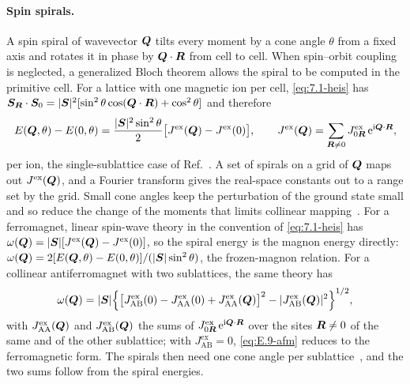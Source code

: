 \paragraph{Spin spirals.} A spin spiral of wavevector $\bm{Q}$ tilts every moment by a cone angle $\theta$ from a fixed axis and rotates it in phase by $\bm{Q}\cdot\bm{R}$ from cell to cell. When spin--orbit coupling is neglected, a generalized Bloch theorem allows the spiral to be computed in the primitive cell. For a lattice with one magnetic ion per cell, \cref{eq:7.1-heis} has $\bm{S}_{\bm{R}}\cdot\bm{S}_0 = |\bm{S}|^2[\sin^2\theta\cos(\bm{Q}\cdot\bm{R}) + \cos^2\theta]$ and therefore
\begin{equation}
  E(\bm{Q},\theta) - E(0,\theta) = \frac{|\bm{S}|^2\sin^2\theta}{2}\bigl[J^{\mathrm{ex}}(\bm{Q}) - J^{\mathrm{ex}}(0)\bigr], \qquad J^{\mathrm{ex}}(\bm{Q}) = \sum_{\bm{R}\neq0}J^{\mathrm{ex}}_{0\bm{R}}\,\mathrm{e}^{\mathrm{i}\bm{Q}\cdot\bm{R}} ,
  \label{eq:E.9-spiral}
\end{equation}
per ion, the single-sublattice case of Ref.~\cite[Eq.~(7)]{jacobsson2013exchange}. A set of spirals on a grid of $\bm{Q}$ maps out $J^{\mathrm{ex}}(\bm{Q})$, and a Fourier transform gives the real-space constants out to a range set by the grid. Small cone angles keep the perturbation of the ground state small and so reduce the change of the moments that limits collinear mapping~\cite[Sect.~II]{jacobsson2013exchange}. For a ferromagnet, linear spin-wave theory in the convention of \cref{eq:7.1-heis} has $\omega(\bm{Q}) = |\bm{S}|[J^{\mathrm{ex}}(\bm{Q}) - J^{\mathrm{ex}}(0)]$, so the spiral energy is the magnon energy directly: $\omega(\bm{Q}) = 2[E(\bm{Q},\theta) - E(0,\theta)]/(|\bm{S}|\sin^2\theta)$, the frozen-magnon relation. For a collinear antiferromagnet with two sublattices, the same theory has
\begin{equation}
  \omega(\bm{Q}) = |\bm{S}|\Bigl\{\bigl[J^{\mathrm{ex}}_{\mathrm{AB}}(0) - J^{\mathrm{ex}}_{\mathrm{AA}}(0) + J^{\mathrm{ex}}_{\mathrm{AA}}(\bm{Q})\bigr]^2 - |J^{\mathrm{ex}}_{\mathrm{AB}}(\bm{Q})|^2\Bigr\}^{1/2} ,
  \label{eq:E.9-afm}
\end{equation}
with $J^{\mathrm{ex}}_{\mathrm{AA}}(\bm{Q})$ and $J^{\mathrm{ex}}_{\mathrm{AB}}(\bm{Q})$ the sums of $J^{\mathrm{ex}}_{0\bm{R}}\,\mathrm{e}^{\mathrm{i}\bm{Q}\cdot\bm{R}}$ over the sites $\bm{R} \ne 0$ of the same and of the other sublattice; with $J^{\mathrm{ex}}_{\mathrm{AB}} = 0$, \cref{eq:E.9-afm} reduces to the ferromagnetic form. The spirals then need one cone angle per sublattice~\cite[Eq.~(8)]{jacobsson2013exchange}, and the two sums follow from the spiral energies.

